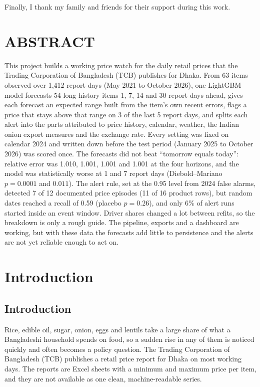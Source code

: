 \documentclass[12pt]{report}
\begin{document}
\noindent Finally, I thank my family and friends for their support during this work.

\chapter*{ABSTRACT}
This project builds a working price watch for the daily retail prices that the Trading Corporation of Bangladesh (TCB) publishes for Dhaka. From 63 items observed over 1,412 report days (May 2021 to October 2026), one LightGBM model forecasts 54 long-history items 1, 7, 14 and 30 report days ahead, gives each forecast an expected range built from the item's own recent errors, flags a price that stays above that range on 3 of the last 5 report days, and splits each alert into the parts attributed to price history, calendar, weather, the Indian onion export measures and the exchange rate. Every setting was fixed on calendar 2024 and written down before the test period (January 2025 to October 2026) was scored once. The forecasts did not beat ``tomorrow equals today'': relative error was 1.010, 1.001, 1.001 and 1.001 at the four horizons, and the model was statistically worse at 1 and 7 report days (Diebold--Mariano $p=0.0001$ and $0.011$). The alert rule, set at the 0.95 level from 2024 false alarms, detected 7 of 12 documented price episodes (11 of 16 product rows), but random dates reached a recall of 0.59 (placebo $p=0.26$), and only 6\% of alert runs started inside an event window. Driver shares changed a lot between refits, so the breakdown is only a rough guide. The pipeline, exports and a dashboard are working, but with these data the forecasts add little to persistence and the alerts are not yet reliable enough to act on.

\newpage
\renewcommand*\contentsname{TABLE OF CONTENTS}
\tableofcontents

\clearpage
{}
{}
\listoftables

\clearpage
{}
{}
\listoffigures
{}

\chapter{Introduction}
\justifying

\section{Introduction}
Rice, edible oil, sugar, onion, eggs and lentils take a large share of what a Bangladeshi household spends on food, so a sudden rise in any of them is noticed quickly and often becomes a policy question. The Trading Corporation of Bangladesh (TCB) publishes a retail price report for Dhaka on most working days. The reports are Excel sheets with a minimum and maximum price per item, and they are not available as one clean, machine-readable series.
\end{document}
